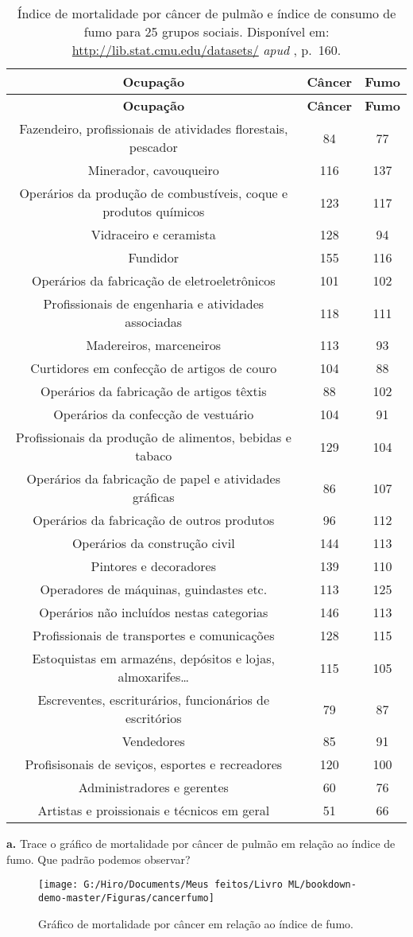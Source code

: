 \documentclass[
]{book}
\begin{document}
\begin{longtable}[]{@{}ccc@{}}
\caption{\label{tab:cancercigarro} Índice de mortalidade por câncer de pulmão e índice de consumo de fumo para 25 grupos sociais. Disponível em: \url{http://lib.stat.cmu.edu/datasets/} \emph{apud} \citep{morettin2017estatistica}, p.~160.}\tabularnewline
\toprule
\textbf{Ocupação} & \textbf{Câncer} & \textbf{Fumo}\tabularnewline
\midrule
\endfirsthead
\toprule
\textbf{Ocupação} & \textbf{Câncer} & \textbf{Fumo}\tabularnewline
\midrule
\endhead
Fazendeiro, profissionais de atividades florestais, pescador & 84 & 77\tabularnewline
Minerador, cavouqueiro & 116 & 137\tabularnewline
Operários da produção de combustíveis, coque e produtos químicos & 123 & 117\tabularnewline
Vidraceiro e ceramista & 128 & 94\tabularnewline
Fundidor & 155 & 116\tabularnewline
Operários da fabricação de eletroeletrônicos & 101 & 102\tabularnewline
Profissionais de engenharia e atividades associadas & 118 & 111\tabularnewline
Madereiros, marceneiros & 113 & 93\tabularnewline
Curtidores em confecção de artigos de couro & 104 & 88\tabularnewline
Operários da fabricação de artigos têxtis & 88 & 102\tabularnewline
Operários da confecção de vestuário & 104 & 91\tabularnewline
Profissionais da produção de alimentos, bebidas e tabaco & 129 & 104\tabularnewline
Operários da fabricação de papel e atividades gráficas & 86 & 107\tabularnewline
Operários da fabricação de outros produtos & 96 & 112\tabularnewline
Operários da construção civil & 144 & 113\tabularnewline
Pintores e decoradores & 139 & 110\tabularnewline
Operadores de máquinas, guindastes etc. & 113 & 125\tabularnewline
Operários não incluídos nestas categorias & 146 & 113\tabularnewline
Profissionais de transportes e comunicações & 128 & 115\tabularnewline
Estoquistas em armazéns, depósitos e lojas, almoxarifes\ldots{} & 115 & 105\tabularnewline
Escreventes, escriturários, funcionários de escritórios & 79 & 87\tabularnewline
Vendedores & 85 & 91\tabularnewline
Profisisonais de seviços, esportes e recreadores & 120 & 100\tabularnewline
Administradores e gerentes & 60 & 76\tabularnewline
Artistas e proissionais e técnicos em geral & 51 & 66\tabularnewline
\bottomrule
\end{longtable}

\newpage

\textbf{a.} Trace o gráfico de mortalidade por câncer de pulmão em relação ao índice de fumo. Que padrão podemos observar?

\begin{figure}

{\centering \texttt{[image: G:/Hiro/Documents/Meus feitos/Livro ML/bookdown-demo-master/Figuras/cancerfumo]} 

}

\caption{Gráfico de mortalidade por câncer em relação ao índice de fumo.}\label{fig:cancerfumo}
\end{figure}
\end{document}
